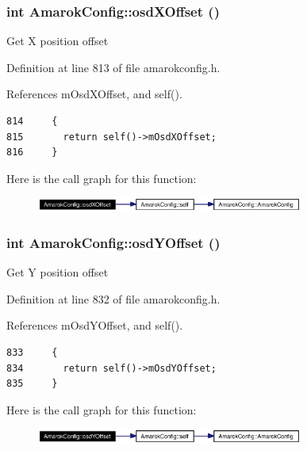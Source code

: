 \subsubsection{\setlength{\rightskip}{0pt plus 5cm}int Amarok\-Config::osd\-XOffset ()\hspace{0.3cm}{\tt  [inline, static]}}\label{classAmarokConfig_AmarokConfige84}


Get X position offset 

Definition at line 813 of file amarokconfig.h.

References m\-Osd\-XOffset, and self().



\footnotesize\begin{verbatim}814     {
815       return self()->mOsdXOffset;
816     }
\end{verbatim}\normalsize 


Here is the call graph for this function:\begin{figure}[H]
\begin{center}
\leavevmode
\includegraphics[width=248pt]{classAmarokConfig_AmarokConfige84_cgraph}
\end{center}
\end{figure}
\subsubsection{\setlength{\rightskip}{0pt plus 5cm}int Amarok\-Config::osd\-YOffset ()\hspace{0.3cm}{\tt  [inline, static]}}\label{classAmarokConfig_AmarokConfige86}


Get Y position offset 

Definition at line 832 of file amarokconfig.h.

References m\-Osd\-YOffset, and self().



\footnotesize\begin{verbatim}833     {
834       return self()->mOsdYOffset;
835     }
\end{verbatim}\normalsize 


Here is the call graph for this function:\begin{figure}[H]
\begin{center}
\leavevmode
\includegraphics[width=248pt]{classAmarokConfig_AmarokConfige86_cgraph}
\end{center}
\end{figure}
